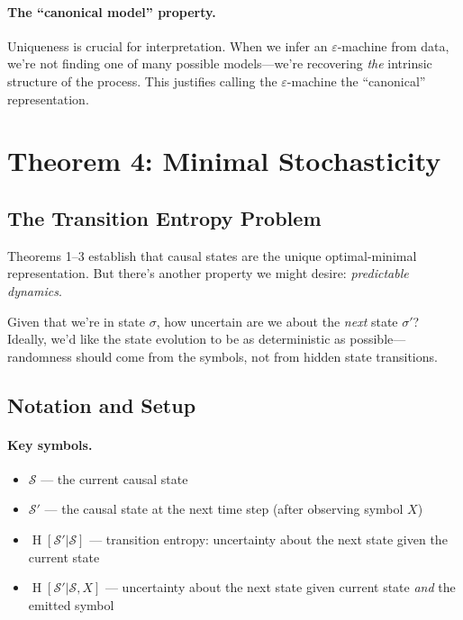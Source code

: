 \documentclass[11pt,a4paper]{article}
\theoremstyle{definition}
\theoremstyle{plain}
\newcommand{\eps}{\varepsilon}
\newcommand{\calS}{\mathcal{S}}
\DeclareMathOperator{\Ent}{H}
\begin{document}
\paragraph{The ``canonical model'' property.} Uniqueness is crucial for interpretation. When we infer an $\eps$-machine from data, we're not finding one of many possible models---we're recovering \emph{the} intrinsic structure of the process. This justifies calling the $\eps$-machine the ``canonical'' representation.

\section{Theorem 4: Minimal Stochasticity}
\label{sec:theorem-stochasticity}

\subsection{The Transition Entropy Problem}

Theorems 1--3 establish that causal states are the unique optimal-minimal representation. But there's another property we might desire: \emph{predictable dynamics}.

Given that we're in state $\sigma$, how uncertain are we about the \emph{next} state $\sigma'$? Ideally, we'd like the state evolution to be as deterministic as possible---randomness should come from the symbols, not from hidden state transitions.

\subsection{Notation and Setup}

\paragraph{Key symbols.}
\begin{itemize}[nosep]
    \item $\calS$ --- the current causal state
    \item $\calS'$ --- the causal state at the next time step (after observing symbol $X$)
    \item $\Ent[\calS' | \calS]$ --- transition entropy: uncertainty about the next state given the current state
    \item $\Ent[\calS' | \calS, X]$ --- uncertainty about the next state given current state \emph{and} the emitted symbol
\end{itemize}
\end{document}
